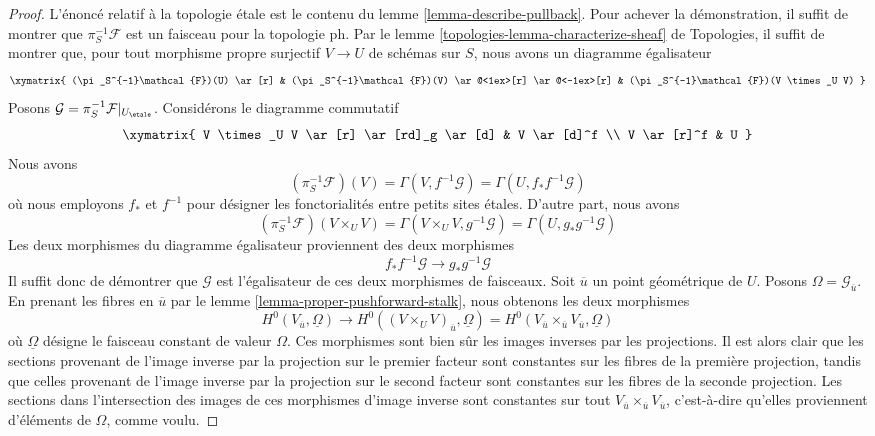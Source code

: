 \begin{proof}
L'énoncé relatif à la topologie étale est le contenu
du lemme \ref{lemma-describe-pullback}. Pour achever la démonstration, il
suffit de montrer que $\pi_S^{-1}\mathcal{F}$ est un faisceau pour la topologie
ph. Par le lemme \ref{topologies-lemma-characterize-sheaf} de Topologies,
il suffit de montrer que, pour tout morphisme propre surjectif
$V \to U$ de schémas sur $S$, nous avons un diagramme égalisateur
$$
\xymatrix{
(\pi_S^{-1}\mathcal{F})(U) \ar[r] &
(\pi_S^{-1}\mathcal{F})(V) \ar@<1ex>[r] \ar@<-1ex>[r] &
(\pi_S^{-1}\mathcal{F})(V \times_U V)
}
$$
Posons $\mathcal{G} = \pi_S^{-1}\mathcal{F}|_{U_\etale}$.
Considérons le diagramme commutatif
$$
\xymatrix{
V \times_U V \ar[r] \ar[rd]_g \ar[d] & V \ar[d]^f \\
V \ar[r]^f & U
}
$$
Nous avons
$$
(\pi_S^{-1}\mathcal{F})(V) = \Gamma(V, f^{-1}\mathcal{G}) =
\Gamma(U, f_*f^{-1}\mathcal{G})
$$
où nous employons $f_*$ et $f^{-1}$ pour désigner les fonctorialités entre
petits sites étales. D'autre part, nous avons
$$
(\pi_S^{-1}\mathcal{F})(V \times_U V) =
\Gamma(V \times_U V, g^{-1}\mathcal{G}) =
\Gamma(U, g_*g^{-1}\mathcal{G})
$$
Les deux morphismes du diagramme égalisateur proviennent des deux morphismes
$$
f_*f^{-1}\mathcal{G} \longrightarrow g_*g^{-1}\mathcal{G}
$$
Il suffit donc de démontrer que $\mathcal{G}$ est
l'égalisateur de ces deux morphismes de faisceaux.
Soit $\overline{u}$ un point géométrique de $U$. Posons
$\Omega = \mathcal{G}_{\overline{u}}$.
En prenant les fibres en $\overline{u}$ par le
lemme \ref{lemma-proper-pushforward-stalk},
nous obtenons les deux morphismes
$$
H^0(V_{\overline{u}}, \underline{\Omega}) \longrightarrow
H^0((V \times_U V)_{\overline{u}}, \underline{\Omega}) =
H^0(V_{\overline{u}} \times_{\overline{u}} V_{\overline{u}},
\underline{\Omega})
$$
où $\underline{\Omega}$ désigne le faisceau constant de valeur
$\Omega$. Ces morphismes sont bien sûr les images inverses par les projections.
Il est alors clair que les sections provenant de l'image inverse
par la projection sur le premier facteur sont constantes sur les fibres de
la première projection, tandis que celles provenant de l'image inverse
par la projection sur le second facteur sont constantes sur les fibres de
la seconde projection. Les sections dans l'intersection des images
de ces morphismes d'image inverse sont constantes sur tout
$V_{\overline{u}} \times_{\overline{u}} V_{\overline{u}}$, c'est-à-dire
qu'elles proviennent d'éléments de $\Omega$, comme voulu.
\end{proof}

